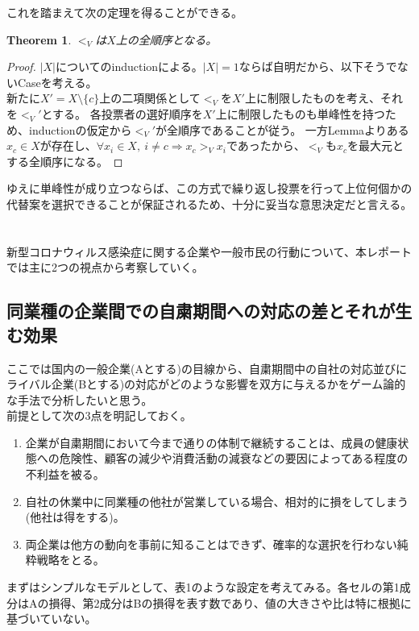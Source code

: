 \documentclass[10pt,uplatex]{jsarticle}
\theoremstyle{case}
\begin{document}
    これを踏まえて次の定理を得ることができる。
    \newtheorem*{theorem}{Theorem}
    \begin{theorem}
        $<_V$は$X$上の全順序となる。
    \end{theorem}
    \begin{proof}
        $|X|$についてのinductionによる。$|X|=1$ならば自明だから、以下そうでないCaseを考える。\\
        新たに$X'=X\setminus\{c\}$上の二項関係として$<_V$を$X'$上に制限したものを考え、それを$<_V'$とする。
        各投票者の選好順序を$X'$上に制限したものも単峰性を持つため、inductionの仮定から$<_V'$が全順序であることが従う。
        一方Lemmaよりある$x_c\in X$が存在し、$\forall x_i\in X,\ i\neq c\Rightarrow x_c>_V x_i$であったから、$<_V$も$x_c$を最大元とする全順序になる。
    \end{proof}
    ゆえに単峰性が成り立つならば、この方式で繰り返し投票を行って上位何個かの代替案を選択できることが保証されるため、十分に妥当な意思決定だと言える。

    \newpage
    \section{}
    新型コロナウィルス感染症に関する企業や一般市民の行動について、本レポートでは主に2つの視点から考察していく。

    \subsection{同業種の企業間での自粛期間への対応の差とそれが生む効果}
    ここでは国内の一般企業(Aとする)の目線から、自粛期間中の自社の対応並びにライバル企業(Bとする)の対応がどのような影響を双方に与えるかをゲーム論的な手法で分析したいと思う。\\
    前提として次の3点を明記しておく。
    \begin{enumerate}[(1)]
        \item 企業が自粛期間において今まで通りの体制で継続することは、成員の健康状態への危険性、顧客の減少や消費活動の減衰などの要因によってある程度の不利益を被る。
        \item 自社の休業中に同業種の他社が営業している場合、相対的に損をしてしまう(他社は得をする)。
        \item 両企業は他方の動向を事前に知ることはできず、確率的な選択を行わない純粋戦略をとる。
    \end{enumerate}

    まずはシンプルなモデルとして、表1のような設定を考えてみる。各セルの第1成分はAの損得、第2成分はBの損得を表す数であり、値の大きさや比は特に根拠に基づいていない。
\end{document}
